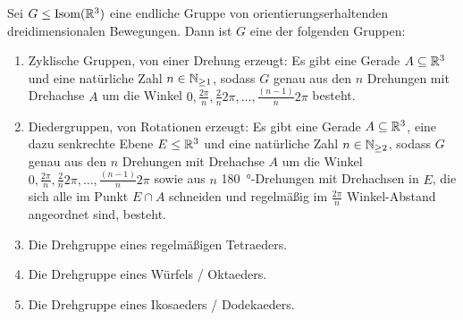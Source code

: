 \begin{theorem}\label{gruppen:klassifikation_drehgruppen_in_3D}
Sei $G\leq\operatorname{Isom}(\mathbb{R}^3)$ eine endliche Gruppe von orientierungserhaltenden dreidimensionalen Bewegungen. Dann ist $G$ eine der folgenden Gruppen:

\begin{enumerate}
\item Zyklische Gruppen, von einer Drehung erzeugt: Es gibt eine Gerade $A\subseteq\mathbb{R}^3$ und eine natürliche Zahl $n\in\mathbb{N}_{\geq 1}$, sodass $G$ genau aus den $n$ Drehungen mit Drehachse $A$ um die Winkel $0,\frac{2\pi}{n}, \frac{2}{n}2\pi, \ldots, \frac{(n-1)}{n}2\pi$ besteht.

\item Diedergruppen, von Rotationen erzeugt: Es gibt eine Gerade $A\subseteq\mathbb{R}^3$, eine dazu senkrechte Ebene $E\leq\mathbb{R}^3$ und eine natürliche Zahl $n\in\mathbb{N}_{\geq 2}$, sodass $G$ genau aus den $n$ Drehungen mit Drehachse $A$ um die Winkel $0,\frac{2\pi}{n}, \frac{2}{n}2\pi, \ldots, \frac{(n-1)}{n}2\pi$ sowie aus $n$ \SI{180}{\degree}-Drehungen mit Drehachsen in $E$, die sich alle im Punkt $E\cap A$ schneiden und regelmäßig im $\frac{2\pi}{n}$ Winkel-Abstand angeordnet sind, besteht.

\item Die Drehgruppe eines regelmäßigen Tetraeders.

\item Die Drehgruppe eines Würfels / Oktaeders.

\item Die Drehgruppe eines Ikosaeders / Dodekaeders.
\end{enumerate}

\end{theorem}
